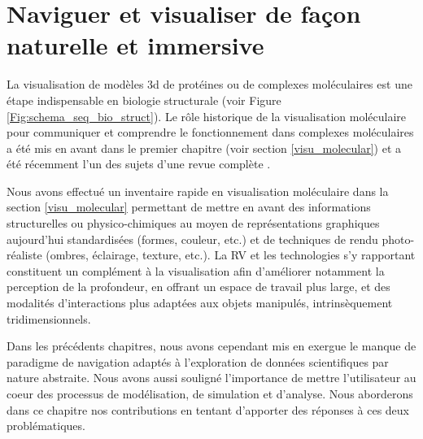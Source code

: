 
\chapter[Exploration interactive de données moléculaire en immersion]{Naviguer et visualiser de façon naturelle et immersive}
\label{Sec:CantorDigitalis}
\minitoc
\cleardoublepage

La visualisation de modèles 3d de protéines ou de complexes moléculaires est une étape indispensable en biologie structurale (voir Figure \ref{Fig:schema_seq_bio_struct}). Le rôle historique de la visualisation moléculaire pour communiquer et comprendre le fonctionnement dans complexes moléculaires a été mis en avant dans le premier chapitre (voir section \ref{visu_molecular}) et a été récemment l'un des sujets d'une revue complète \cite{kehrer_visualization_2013}.

Nous avons effectué un inventaire rapide en visualisation moléculaire dans la section \ref{visu_molecular} permettant de mettre en avant des informations structurelles ou physico-chimiques au moyen de représentations graphiques aujourd'hui standardisées (formes, couleur, etc.) et de techniques de rendu photo-réaliste (ombres, éclairage, texture, etc.). La RV et les technologies s'y rapportant constituent un complément à la visualisation afin d'améliorer notamment la perception de la profondeur, en offrant un espace de travail plus large, et des modalités d'interactions plus adaptées aux objets manipulés, intrinsèquement tridimensionnels.


Dans les précédents chapitres, nous avons cependant mis en exergue le manque de paradigme de navigation adaptés à l'exploration de données scientifiques par nature abstraite. Nous avons aussi souligné l'importance de mettre l'utilisateur au coeur des processus de modélisation, de simulation et d'analyse. Nous aborderons dans ce chapitre nos contributions en tentant d'apporter des réponses à ces deux problématiques.

